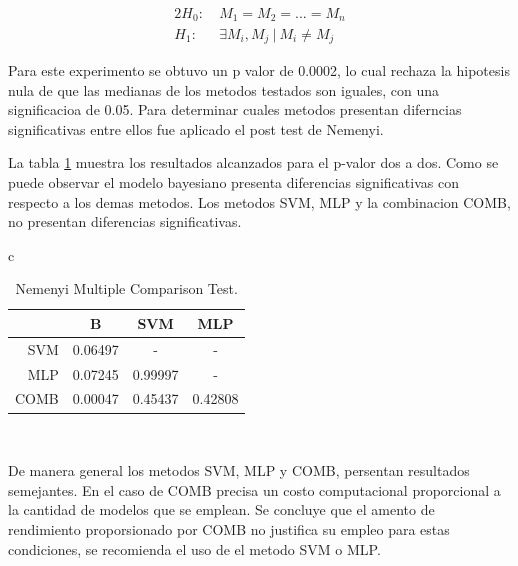 \documentclass[12pt]{article}
\begin{document}
\begin{alignat*}{2}
  H_0:  & \ M_1 = M_2 = ... =M_n \\
  H_1:  & \ \exists M_i,M_j \ | \ M_i\neq M_j
\end{alignat*}

Para este experimento se obtuvo un p valor de 0.0002, lo cual rechaza la hipotesis nula de que las medianas de los metodos testados son iguales, con una significacioa de 0.05. Para determinar cuales metodos presentan diferncias significativas entre ellos fue aplicado el post test de Nemenyi. 

La tabla \ref{tab:test_nemeyi} muestra los resultados alcanzados para el p-valor dos a dos. Como se puede observar el modelo bayesiano presenta diferencias significativas con respecto a los demas metodos. Los metodos SVM, MLP y la combinacion COMB, no presentan diferencias significativas. 

\begin{table}[!h]
\renewcommand{\arraystretch}{1.3}
\caption{Nemenyi Multiple Comparison Test. }
\label{tab:test_nemeyi}
\centering
\begin{tabular}{c}
\begin{tabular}{rccc}
\hline
    &B       &SVM     &MLP         \\    
\hline                             
SVM &0.06497 &-       &-           \\  
MLP &0.07245 &0.99997 &-           \\
COMB &0.00047 &0.45437 &0.42808    \\
\hline 
\end{tabular}\\
\end{tabular}
\end{table}

De manera general los metodos SVM, MLP y COMB, persentan resultados semejantes. En el caso de COMB precisa un costo computacional proporcional a la cantidad de modelos que se emplean. Se concluye que el amento de rendimiento proporsionado por COMB no justifica su empleo para estas condiciones, se recomienda el uso de el metodo SVM o MLP. 


\end{document}
